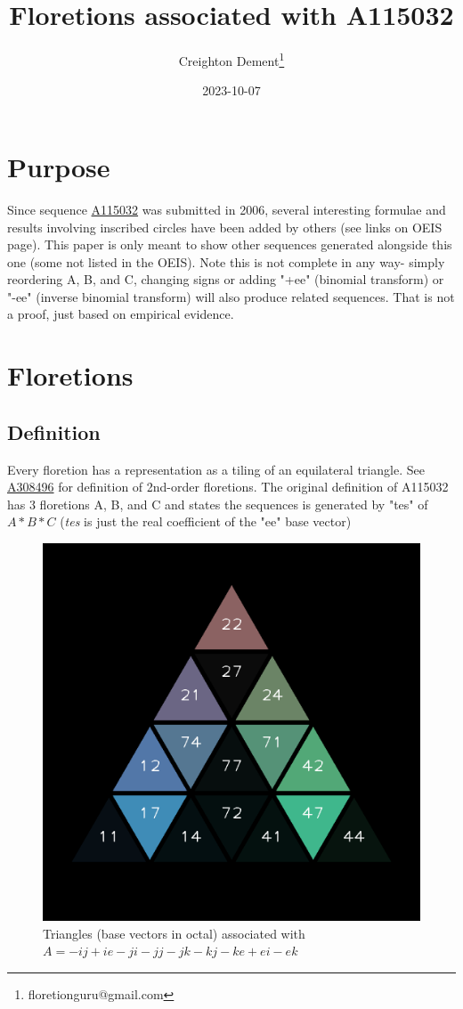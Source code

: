 \documentclass[12pt]{article}
\title{Floretions associated with A115032}
\author{Creighton Dement\thanks{floretionguru@gmail.com}}
\date{2023-10-07}
\begin{document}
\maketitle

\section{Purpose}
Since sequence  \href{https://oeis.org/A115032}{A115032} was submitted in 2006, several interesting formulae and results involving inscribed circles have been added by others (see links on OEIS page). This paper is only meant to show other sequences generated alongside this one (some not listed in the OEIS). Note this is not complete in any way- simply reordering A, B, and C, changing signs or adding "+ee" (binomial transform) or "-ee" (inverse binomial transform) will also produce related sequences. That is not a proof, just based on empirical evidence. 

\section{Floretions}

\subsection{Definition}

Every floretion has a representation as a tiling of an equilateral triangle. See \href{https://oeis.org/A308496}{A308496} for definition of 2nd-order floretions. The original definition of A115032 has 3 floretions A, B, and C and states the sequences is generated by "tes" of $A*B*C$ (\textit{tes} is just the real coefficient of the "ee" base vector)

 
\begin{figure}[h]
  \centering
  \includegraphics[scale=0.25]{order_2A115032_floA.png}
  \caption{Triangles (base vectors in octal) associated with $A = -ij + ie - ji - jj - jk - kj - ke + ei - ek$  } 
\end{figure}
\end{document}
